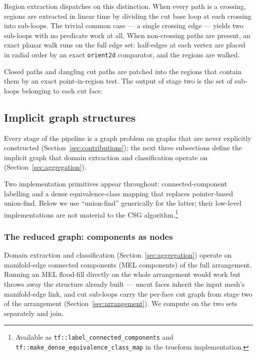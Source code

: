 \documentclass{egpubl}
\begin{document}
Region extraction dispatches on this distinction. When every path is a crossing, regions are extracted in linear time by dividing the cut base loop at each crossing into sub-loops. The trivial common case --- a single crossing edge --- yields two sub-loops with no predicate work at all. When non-crossing paths are present, an exact planar walk runs on the full edge set: half-edges at each vertex are placed in radial order by an exact \texttt{orient2d} comparator, and the regions are walked.

Closed paths and dangling cut paths are patched into the regions that contain them by an exact point-in-region test. The output of stage two is the set of sub-loops belonging to each cut face.

\subsection{Implicit graph structures}
\label{sec:graphs}

Every stage of the pipeline is a graph problem on graphs that are never explicitly constructed (Section~\ref{sec:contributions}); the next three subsections define the implicit graph that domain extraction and classification operate on (Section~\ref{sec:aggregation}).

Two implementation primitives appear throughout: connected-component labelling and a dense equivalence-class mapping that replaces pointer-based union-find. Below we use ``union-find'' generically for the latter; their low-level implementations are not material to the CSG algorithm.\footnote{Available as \texttt{tf::label\_connected\_components} and \texttt{tf::make\_dense\_equivalence\_class\_map} in the trueform implementation.}

\subsubsection*{The reduced graph: components as nodes}

Domain extraction and classification (Section~\ref{sec:aggregation}) operate on manifold-edge connected components (MEL components) of the full arrangement. Running an MEL flood-fill directly on the whole arrangement would work but throws away the structure already built --- uncut faces inherit the input mesh's manifold-edge link, and cut sub-loops carry the per-face cut graph from stage two of the arrangement (Section~\ref{sec:arrangement}). We compute on the two sets separately and join.
\end{document}
